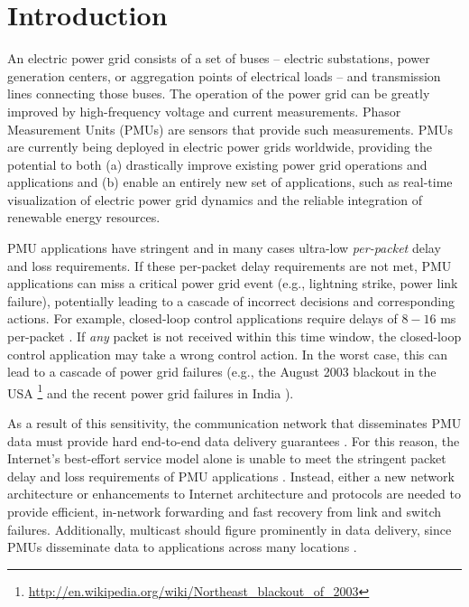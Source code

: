 

\section{Introduction}
\label{sec:intro}

An electric power grid consists of a set of buses  -- electric substations, power generation centers, or aggregation points of electrical loads -- and transmission lines connecting those buses.
The operation of the power grid can be greatly improved by high-frequency voltage and current measurements. Phasor Measurement Units (PMUs) are  
sensors that provide such measurements. PMUs are currently being deployed in electric power grids worldwide, providing the potential to both 
(a) drastically improve existing power grid operations and applications and (b) enable an entirely new set of applications,
such as real-time visualization of electric power grid dynamics and the reliable integration of renewable energy resources. 

PMU applications have stringent and in many cases ultra-low \emph{per-packet} delay and loss requirements.  
If these per-packet delay requirements are not met, PMU applications can miss a critical power grid event (e.g., lightning strike, power link failure), potentially leading to a 
cascade of incorrect decisions and corresponding actions. For example, closed-loop control applications require delays of $8-16$ ms per-packet \cite{Bakken11}. 
If \emph{any} packet is not received within this time window, the closed-loop control application may take a wrong control action.
In the worst case, this can lead to a cascade of power grid failures (e.g., the August 2003 blackout in the USA 
\footnote{\url{http://en.wikipedia.org/wiki/Northeast\_blackout\_of\_2003}} and the recent power grid failures in India \cite{IndiaBlackout}). 


As a result of this sensitivity, the communication network that disseminates PMU data must provide hard end-to-end data delivery guarantees \cite{Bakken11}. 
For this reason, the Internet's best-effort service model alone is unable to meet the stringent packet delay and loss requirements of PMU applications \cite{Birman05}. 
Instead, either a new network architecture or enhancements to Internet architecture and protocols are needed \cite{Bakken11,Birman05,Naspi10,Hopkinson09} to provide efficient, in-network forwarding and fast recovery from link and switch failures. 
Additionally, multicast should figure prominently in data  delivery, since PMUs disseminate  data  to applications across many locations \cite{Bakken11}.

